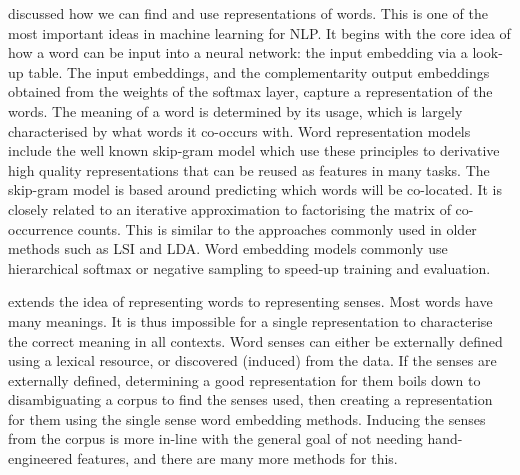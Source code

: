 \documentclass[12pt,parskip]{komatufte}
\begin{document}

 discussed how we can find and use representations of words.
This is one of the most important ideas in machine learning for NLP.
It begins with the core idea of how a word can be input into a neural network:
the input embedding via a look-up table.
The input embeddings, and the complementarity output embeddings obtained from the weights of the softmax layer, capture a representation of the words.
The meaning of a word is determined by its usage, which is largely characterised by what words it co-occurs with.
Word representation models include the well known skip-gram model which use these principles to derivative high quality representations that can be reused as features in many tasks.
The skip-gram model is based around predicting which words will be co-located.
It is closely related to an iterative approximation to factorising the matrix of co-occurrence counts.
This is similar to the approaches commonly used in older methods such as LSI and LDA.
Word embedding models commonly use  hierarchical softmax or negative sampling to speed-up training and evaluation.



 extends the idea of representing words to representing senses.
Most words have many meanings.
It is thus impossible for a single representation to characterise the correct meaning in all contexts.
Word senses can either be externally defined using a lexical resource,
or discovered (induced) from the data.
If the senses are externally defined, determining a good representation for them boils down to disambiguating a corpus to find the senses used, then creating a representation for them using the single sense word embedding methods.
Inducing the senses from the corpus is more in-line with the general goal of not needing hand-engineered features, and there are many more methods for this.
\end{document}
